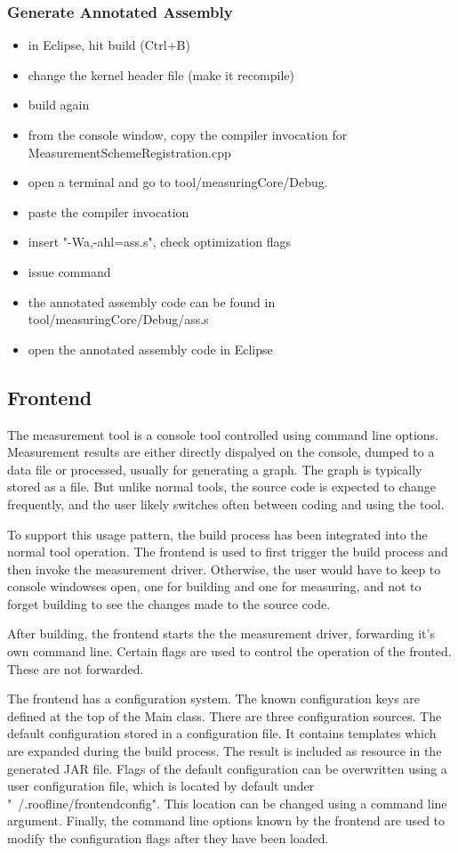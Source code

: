 \documentclass[a4paper,12pt]{article}
\begin{document}
\subsubsection{Generate Annotated Assembly}
\begin{itemize}
\item in Eclipse, hit build (Ctrl+B)
\item change the kernel header file (make it recompile)
\item build again
\item from the console window, copy the compiler invocation for MeasurementSchemeRegistration.cpp
\item open a terminal and go to tool/measuringCore/Debug.
\item paste the compiler invocation
\item insert "-Wa,-ahl=ass.s", check optimization flags
\item issue command
\item the annotated assembly code can be found in tool/measuringCore/Debug/ass.s
\item open the annotated assembly code in Eclipse
\end{itemize}

\subsection{Frontend}
The measurement tool is a console tool controlled using command line options. Measurement results are either directly dispalyed on the console, dumped to a data file or processed, usually for generating a graph. The graph is typically stored as a file. But unlike normal tools, the source code is expected to change frequently, and the user likely switches often between coding and using the tool.

To support this usage pattern, the build process has been integrated into the normal tool operation. The frontend is used to first trigger the build process and then invoke the measurement driver. Otherwise, the user would have to keep to console windowses open, one for building and one for measuring, and not to forget building to see the changes made to the source code.

After building, the frontend starts the the measurement driver, forwarding it's own command line. Certain flags are used to control the operation of the fronted. These are not forwarded.

The frontend has a configuration system. The known configuration keys are defined at the top of the Main class. There are three configuration sources. The default configuration stored in a configuration file. It contains templates which are expanded during the build process. The result is included as resource in the generated JAR file. Flags of the default configuration can be overwritten using a user configuration file, which is located by default under "~/.roofline/frontendconfig". This location can be changed using a command line argument. Finally, the command line options known by the frontend are used to modify the configuration flags after they have been loaded. 
\end{document}

